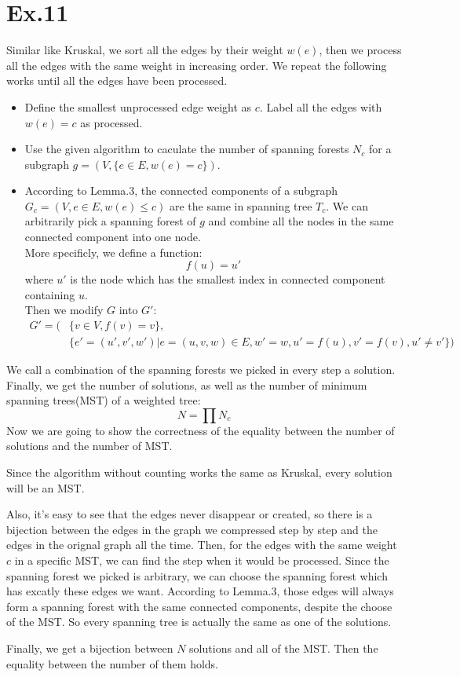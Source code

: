 	\section{Ex.11}
	Similar like Kruskal, we sort all the edges by their weight $w(e)$, then we process all the edges with the same weight in increasing order. We repeat the following works until all the edges have been processed.
	\begin{itemize}
		\item Define the smallest unprocessed edge weight as $c$. Label all the edges with $w(e)=c$ as processed.
		\item Use the given algorithm to caculate the number of spanning forests $N_c$ for a subgraph $g=(V,\{e\in E,w(e)=c\})$.
		\item According to Lemma.3, the connected components of a subgraph $G_c=(V,{e\in E,w(e)\leq c})$ are the same in spanning tree $T_c$. We can arbitrarily pick a spanning forest of $g$ and combine all the nodes in the same connected component into one node.\\
		More specificly, we define a function: $$f(u)=u'$$ where $u'$ is the node which has the smallest index in connected component containing $u$.\\ Then we modify $G$ into $G'$:
		\begin{align*}
		G'=(&\{v\in V,f(v)=v\},\\
		&\{e'=(u',v',w')|e=(u,v,w)\in E,w'=w,u'=f(u),v'=f(v),u'\neq v'\})
		\end{align*}
	\end{itemize}
	We call a combination of the spanning forests we picked in every step a solution. Finally, we get the number of solutions, as well as the number of minimum spanning trees(MST) of a weighted tree:
	$$N=\prod N_c$$
	Now we are going to show the correctness of the equality between the number of solutions and the number of MST.\par
	Since the algorithm without counting works the same as Kruskal, every solution will be an MST.\par
	Also, it's easy to see that the edges never disappear or created, so there is a bijection between the edges in the graph we compressed step by step and the edges in the orignal graph all the time. Then, for the edges with the same weight $c$ in a specific MST, we can find the step when it would be processed. Since the spanning forest we picked is arbitrary, we can choose the spanning forest which has excatly these edges we want. According to Lemma.3, those edges will always form a spanning forest with the same connected components, despite the choose of the MST. So every spanning tree is actually the same as one of the solutions.\par
	Finally, we get a bijection between $N$ solutions and all of the MST. Then the equality between the number of them holds.

